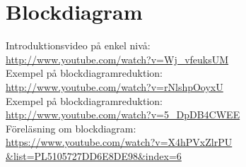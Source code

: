 \documentclass[a4paper]{article}
\begin{document}
\newpage


\section{Blockdiagram}
Introduktionsvideo på enkel nivå:\\
\href{http://www.youtube.com/watch?v=Wj_vfeuksUM}{http://www.youtube.com/watch?v=Wj\_vfeuksUM}\\

Exempel på blockdiagramreduktion:\\
\href{http://www.youtube.com/watch?v=rNlshpOoyxU}{http://www.youtube.com/watch?v=rNlshpOoyxU}\\

Exempel på blockdiagramreduktion:\\
\href{http://www.youtube.com/watch?v=5_DpDB4CWEE}{http://www.youtube.com/watch?v=5\_DpDB4CWEE}\\

Föreläsning om blockdiagram:\\
\href{https://www.youtube.com/watch?v=X4hPVxZlrPU&list=PL5105727DD6E8DE98&index=6}{https://www.youtube.com/watch?v=X4hPVxZlrPU\\\&list=PL5105727DD6E8DE98\&index=6}
\end{document}
